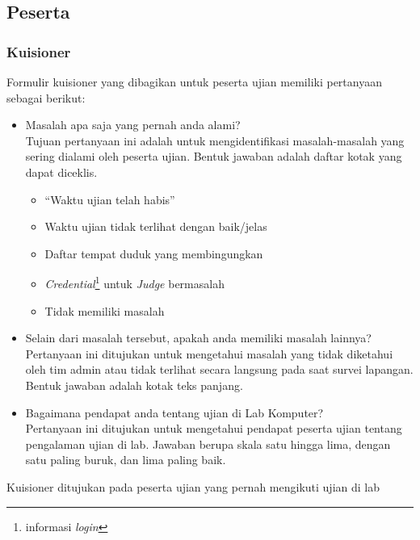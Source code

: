 \subsection{Peserta}
    \subsubsection{Kuisioner}
    Formulir kuisioner yang dibagikan untuk peserta ujian memiliki pertanyaan
    sebagai berikut:
    \begin{itemize}
        \item Masalah apa saja yang pernah anda alami?\\
            Tujuan pertanyaan ini adalah untuk mengidentifikasi masalah-masalah
            yang sering dialami oleh peserta ujian. Bentuk jawaban adalah daftar
            kotak yang dapat diceklis.
            \begin{itemize}
                \item ``Waktu ujian telah habis''
                \item Waktu ujian tidak terlihat dengan baik/jelas
                \item Daftar tempat duduk yang membingungkan
                \item \textit{Credential}\footnote{informasi \textit{login}}
                untuk \textit{Judge} bermasalah
                \item Tidak memiliki masalah
            \end{itemize}
            
        \item Selain dari masalah tersebut, apakah anda memiliki masalah
        lainnya?\\
            Pertanyaan ini ditujukan untuk mengetahui masalah yang tidak
            diketahui oleh tim admin atau tidak terlihat secara langsung pada
            saat survei lapangan. Bentuk jawaban adalah kotak teks panjang.
            
        \item Bagaimana pendapat anda tentang ujian di Lab Komputer?\\
            Pertanyaan ini ditujukan untuk mengetahui pendapat peserta ujian
            tentang pengalaman ujian di lab. Jawaban berupa skala satu hingga
            lima, dengan satu paling buruk, dan lima paling baik.
            
    \end{itemize}
    Kuisioner ditujukan pada peserta ujian yang pernah mengikuti ujian di lab
